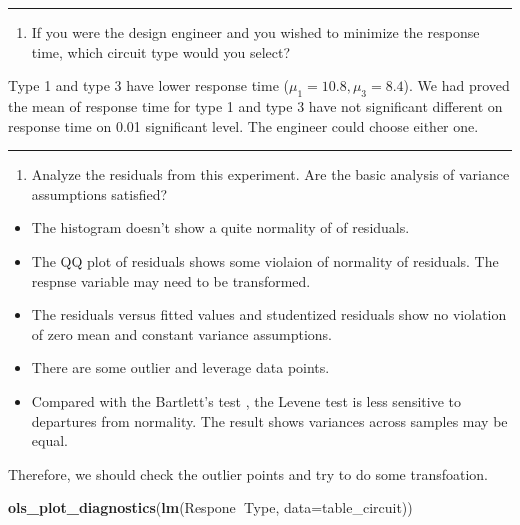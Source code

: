 \documentclass[]{article}
\newenvironment{Shaded}{\begin{snugshade}}{\end{snugshade}}
\newcommand{\DataTypeTok}[1]{\textcolor[rgb]{0.13,0.29,0.53}{#1}}
\newcommand{\KeywordTok}[1]{\textcolor[rgb]{0.13,0.29,0.53}{\textbf{#1}}}
\newcommand{\NormalTok}[1]{#1}
\newcommand{\OperatorTok}[1]{\textcolor[rgb]{0.81,0.36,0.00}{\textbf{#1}}}
\providecommand{\tightlist}{%
  \setlength{\itemsep}{0pt}\setlength{\parskip}{0pt}}
\begin{document}
\begin{center}\rule{0.5\linewidth}{\linethickness}\end{center}

\begin{enumerate}
\def\labelenumi{(\alph{enumi})}
\setcounter{enumi}{4}
\tightlist
\item
  If you were the design engineer and you wished to minimize the
  response time, which circuit type would you select?
\end{enumerate}

Type 1 and type 3 have lower response time (\(\mu_1=10.8,\mu_3=8.4\)).
We had proved the mean of response time for type 1 and type 3 have not
significant different on response time on 0.01 significant level. The
engineer could choose either one.

\begin{center}\rule{0.5\linewidth}{\linethickness}\end{center}

\begin{enumerate}
\def\labelenumi{(\alph{enumi})}
\setcounter{enumi}{5}
\tightlist
\item
  Analyze the residuals from this experiment. Are the basic analysis of
  variance assumptions satisfied?
\end{enumerate}

\begin{itemize}
\tightlist
\item
  The histogram doesn't show a quite normality of of residuals.
\item
  The QQ plot of residuals shows some violaion of normality of
  residuals. The respnse variable may need to be transformed.
\item
  The residuals versus fitted values and studentized residuals show no
  violation of zero mean and constant variance assumptions.
\item
  There are some outlier and leverage data points.
\item
  Compared with the Bartlett's test , the Levene test is less sensitive
  to departures from normality. The result shows variances across
  samples may be equal.
\end{itemize}

Therefore, we should check the outlier points and try to do some
transfoation.

\begin{Shaded}
\begin{Highlighting}[]
\KeywordTok{ols_plot_diagnostics}\NormalTok{(}\KeywordTok{lm}\NormalTok{(Respone}\OperatorTok{~}\NormalTok{Type, }\DataTypeTok{data=}\NormalTok{table_circuit))}
\end{Highlighting}
\end{Shaded}
\end{document}
